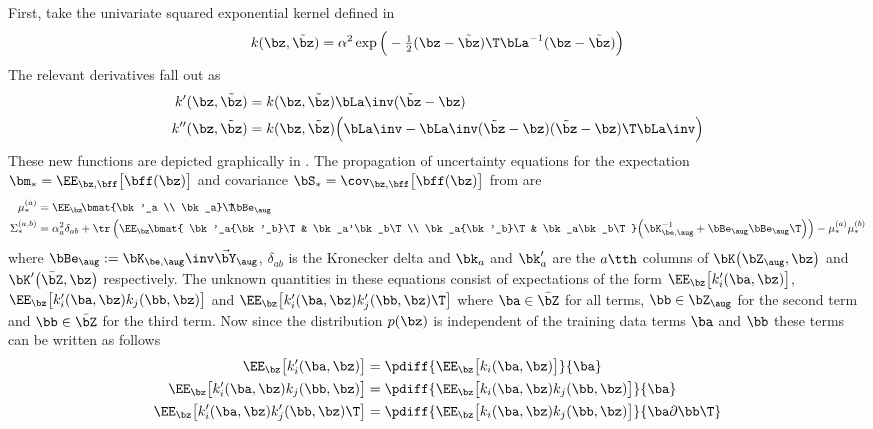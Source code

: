 First, take the univariate squared exponential kernel defined in 
\begin{equation*}
k(\bz,\tilde\bz) = \alpha^2 \exp\Big(-\tfrac{1}{2}(\bz - \tilde\bz)\T\bLa^{-1}(\bz - \tilde\bz) \Big)
\end{equation*}
The relevant derivatives fall out as
\begin{align}
k'(\bz, \tilde\bz) &= k(\bz,\tilde\bz) \bLa\inv (\tilde\bz - \bz) \\
k''(\bz, \tilde\bz) &= k(\bz, \tilde\bz)  \Big(\bLa\inv - \bLa\inv(\tilde\bz - \bz)(\tilde\bz - \bz)\T\bLa\inv \Big) 
\end{align}
These new functions are depicted graphically in . %
The propagation of uncertainty equations for the expectation $\bm_* = \EE_{\bz,\bff}\big[\bff(\bz)\big]$ and covariance $\bS_* = \cov_{\bz,\bff}\big[\bff(\bz)\big]$ from  are
\begin{align}
\mu^{(a)}_* &= 
\EE_{\bz} \!\bmat{\bk'_a \\ \bk_a}\T \!\!\bBe_{\aug} \\
%
\Sigma^{(a,b)}_* &= 
\alpha^2_a\delta_{ab} + \tr\left( \EE_{\bz}\!\bmat{
\bk'_a{\bk'_b}\T & \bk_a'\bk_b\T \\ \bk_a{\bk'_b}\T & \bk_a\bk_b\T
} \Big(\bK_{\be,\aug}^{-1} + \bBe_{\aug}\bBe_{\aug}\T\Big) \right) 
- \mu^{(a)}_*\mu^{(b)}_*
\end{align}
where $\bBe_{\aug} := \bK_{\be,\aug}\inv\vec\bY_{\aug}$, $\delta_{ab}$ is the Kronecker delta and $\bk_a$ and $\bk_a'$ are the $a\tth$ columns of $\bK\big(\bZ_{\aug},\bz\big)$ and $\bK'\big(\bar\bZ,\bz\big)$ respectively. The unknown quantities in these equations consist of expectations of the form $\EE_{\bz}\big[k'_i(\ba,\bz)\big]$, $\EE_{\bz}\big[k'_i(\ba,\bz)k_j(\bb,\bz)\big]$ and $\EE_{\bz}\big[k'_i(\ba,\bz)k'_j(\bb,\bz)\T\big]$
where $\ba \in \bar\bZ$ for all terms, $\bb \in \bZ_{\aug}$ for the second term and $\bb \in \bar\bZ$ for the third term. Now since the distribution $p(\bz)$ is independent of the training data terms $\ba$ and $\bb$ these terms can be written as follows
\begin{align}
\EE_{\bz}\big[k'_i(\ba,\bz)\big]
&= \pdiff{ \EE_{\bz}\big[k_i(\ba,\bz)\big] }{\ba} \label{eqn:kdiff1} \\
\EE_{\bz}\big[k'_i(\ba,\bz)k_j(\bb,\bz)\big]
&= \pdiff{ \EE_{\bz}\big[k_i(\ba,\bz)k_j(\bb,\bz)\big] }{\ba} \label{eqn:kdiff2} \\
\EE_{\bz}\big[k'_i(\ba,\bz)k'_j(\bb,\bz)\T \big]
&= \pdiff{  \EE_{\bz}\big[k_i(\ba,\bz)k_j(\bb,\bz)\big] }{\ba \partial \bb\T} \label{eqn:kdiff3} 
\end{align}
